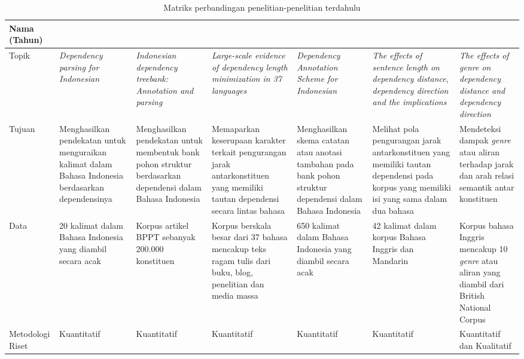 \pagestyle{empty}
\begin{landscape}
\begin{table}[htbp]
\caption{Matriks perbandingan penelitian-penelitian terdahulu}\label{tab:penelitianterdahulu}
\begin{scriptsize}
\begin{center}
\begin{tabular}{| p{2cm} | p{3cm} | p{3cm} | p{3cm} | p{3cm} | p{3cm} | p{3cm} |}
\hline
Nama (Tahun) & \cite{kamayani2011dependency} & \cite{green2012indonesian} & \cite{futrell2015large} & \cite{irmawati2015dependency} & \cite{jiang2015effects} & \cite{wang2017effects} \\ \hline
Topik & \textit{Dependency parsing for Indonesian} & \textit{Indonesian dependency treebank: Annotation and parsing} & \textit{Large-scale evidence of dependency length minimization in 37 languages} & \textit{Dependency Annotation Scheme for Indonesian} & \textit{The effects of sentence length on dependency distance, dependency direction and the implications} & \textit{The effects of genre on dependency distance and dependency direction} \\ \hline
Tujuan & Menghasilkan pendekatan untuk menguraikan kalimat dalam Bahasa Indonesia berdasarkan dependensinya & Menghasilkan pendekatan untuk membentuk bank pohon struktur berdasarkan dependensi dalam Bahasa Indonesia & Memaparkan keserupaan karakter terkait pengurangan jarak antarkonstituen yang memiliki tautan dependensi secara lintas bahasa & Menghasilkan skema catatan atau anotasi tambahan pada bank pohon struktur dependensi dalam Bahasa Indonesia & Melihat pola pengurangan jarak antarkonstituen yang memiliki tautan dependensi pada korpus yang memiliki isi yang sama dalam dua bahasa & Mendeteksi dampak \textit{genre} atau aliran terhadap jarak dan arah relasi semantik antar konstituen \\ \hline
Data & 20 kalimat dalam Bahasa Indonesia yang diambil secara acak & Korpus artikel BPPT sebanyak 200.000 konstituen & Korpus berskala besar dari 37 bahasa mencakup teks ragam tulis dari buku, blog, penelitian dan media massa & 650 kalimat dalam Bahasa Indonesia yang diambil secara acak & 42 kalimat dalam korpus Bahasa Inggris dan Mandarin & Korpus bahasa Inggris mencakup 10 \textit{genre} atau aliran yang diambil dari British National Corpus \\ \hline
Metodologi Riset & Kuantitatif & Kuantitatif & Kuantitatif & Kuantitatif & Kuantitatif & Kuantitatif dan Kualitatif \\ \hline

\end{tabular}
\end{center}
\end{scriptsize}
\end{table}
\end{landscape}
